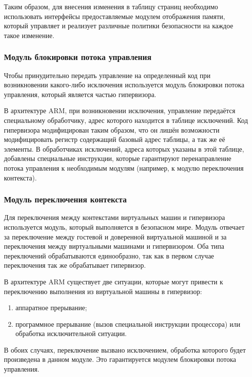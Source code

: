 Таким образом, для внесения изменения в таблицу страниц необходимо использовать интерфейсы предоставляемые модулем отображения памяти, который управляет и реализует различные политики безопасности на каждое такое изменение.

\subsubsection{Модуль блокировки потока управления}

Чтобы принудительно передать управление на определенный код при возникновении какого-либо исключения используется модуль блокировки потока управления, который является частью гипервизора.

В архитектуре ARM, при возникновении исключения, управление передаётся специальному обработчику, адрес которого находится в таблице исключений. Код гипервизора модифицирован таким образом, что он лишён возможности модифицировать регистр содержащий базовый адрес таблицы, а так же её элементы. В обработчиках исключений, адреса которых указаны в этой таблице, добавлены специальные инструкции, которые гарантируют перенаправление потока управления к необходимым модулям (например, к модулю переключения контекста).

\subsubsection{Модуль переключения контекста}

Для переключения между контекстами виртуальных машин и гипервизора используется модуль, который выполняется в безопасном мире. Модуль отвечает за переключение между гостевой и доверенной виртуальной машиной и за переключения между виртуальными машинами и гипервизором. Оба типа переключений обрабатываются единообразно, так как в первом случае переключения так же обрабатывает гипервизор.

В архитектуре ARM существует две ситуации, которые могут привести к переключению выполнения из виртуальной машины в гипервизор:

\begin{enumerate}
	\item аппаратное прерывание;
	\item программное прерывание (вызов специальной инструкции процессора) или обработка исключительной ситуации.
\end{enumerate}

В обоих случаях, переключение вызвано исключением, обработка которого будет произведена в данном модуле. Это гарантируется модулем блокировки потока управления.

